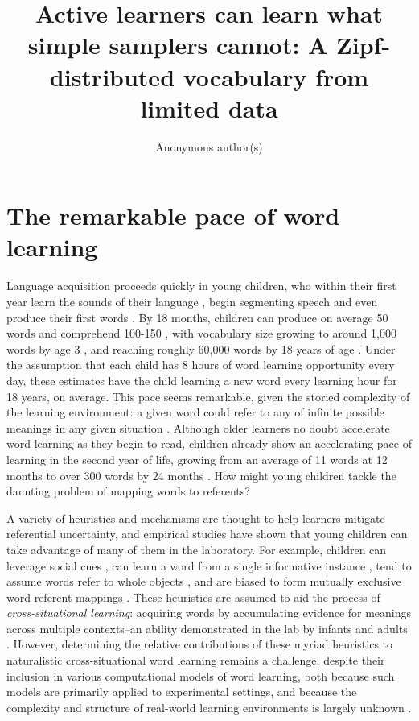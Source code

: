 \documentclass[a4paper,natbib,man]{apa6}
\title{Active learners can learn what simple samplers cannot: A Zipf-distributed vocabulary from limited data}
\author{Anonymous author(s)}
\affiliation{}
\newcommand{\GK}[1]{#1}
\begin{document}
\maketitle

\section{The remarkable pace of word learning}

Language acquisition proceeds quickly in young children, who within their first year learn the sounds of their language \citep{Kuhl:1992}, begin segmenting speech \citep{Saffran:1996} and even produce their first words \citep{Hulit:2002}.
By 18 months, children can produce on average 50 words and comprehend 100-150 \citep{Hulit:2002}, with vocabulary size growing to around 1,000 words by age 3 \citep{Hart:1995}, and reaching roughly 60,000 words by 18 years of age \citep{Bloom:2000}.
Under the assumption that each child has 8 hours of word learning opportunity every day, these estimates have the child learning a new word every learning hour for 18 years, on average. 
This pace seems remarkable, given the storied complexity of the learning environment: a given word could refer to any of infinite possible meanings in any given situation \citep[cf.][]{Blythe:2016}. %
\GK{Although older learners no doubt accelerate word learning as they begin to read, children already show an accelerating pace of learning in the second year of life, growing from an average of 11 words at 12 months to over 300 words by 24 months \citep{wordbankbook,fenson2007}.
How might young children tackle the daunting problem of mapping words to referents?}


A variety of heuristics and mechanisms are thought to help learners mitigate referential uncertainty, and empirical studies have shown that young children can take advantage of many of them in the laboratory. 
For example, children can leverage social cues \citep{HirshPasek:2000}, can learn a word from a single informative instance \citep[i.e., {\em fast-map};][]{Carey:1978,Spiegel:2011}, tend to assume words refer to whole objects \citep{Macnamara:1972}, \GK{and are biased to form mutually exclusive word-referent mappings \citep{Merriman:1989}}. 
These heuristics are assumed to aid the process of {\it cross-situational learning}: acquiring words by accumulating evidence for meanings across multiple contexts--an ability demonstrated in the lab by infants and adults \citep{Smith:2008vg,Yu:2007}. 
However, determining the relative contributions of these myriad heuristics to naturalistic cross-situational word learning remains a challenge, \GK{despite their inclusion in various computational models of word learning, both because such models are primarily applied to experimental settings, and because the complexity and structure of real-world learning environments is largely unknown \citep[though see][]{Smith:2018,Suanda:2018,Clerkin:2017}.}
\end{document}
